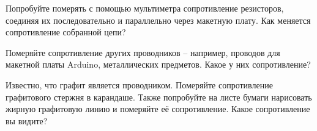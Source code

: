 \documentclass[../main.tex]{subfiles}
\begin{document}

 { Попробуйте померять с помощью мультиметра сопротивление
  резисторов, соединяя их последовательно и параллельно через макетную плату.
  Как меняется сопротивление собранной цепи? }

 { Померяйте сопротивление других проводников -- например, проводов
  для макетной платы Arduino, металлических предметов. Какое у них
  сопротивление?}

 { Известно, что графит является проводником. Померяйте
  сопротивление графитового стержня в карандаше.  Также попробуйте на листе
  бумаги нарисовать жирную графитовую линию и померяйте её сопротивление.  Какое
  сопротивление вы видите? }
\end{document}

